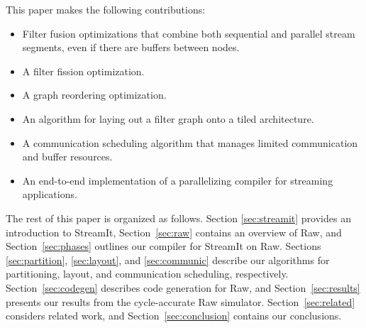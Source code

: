 This paper makes the following contributions:
\begin{itemize}
\item Filter fusion optimizations that combine both sequential and
parallel stream segments, even if there are buffers between nodes.
\item A filter fission optimization.
\item A graph reordering optimization.
\item An algorithm for laying out a filter graph onto a tiled architecture.
\item A communication scheduling algorithm that manages limited 
communication and buffer resources.
\item An end-to-end implementation of a parallelizing compiler for
streaming applications.
\end{itemize}

The rest of this paper is organized as follows.  Section
\ref{sec:streamit} provides an introduction to StreamIt,
Section~\ref{sec:raw} contains an overview of Raw, and
Section~\ref{sec:phases} outlines our compiler for StreamIt on Raw.
Sections \ref{sec:partition}, \ref{sec:layout}, and \ref{sec:communic}
describe our algorithms for partitioning, layout, and communication
scheduling, respectively.  Section~\ref{sec:codegen} describes code
generation for Raw, and Section~\ref{sec:results} presents our results
from the cycle-accurate Raw simulator.  Section~\ref{sec:related}
considers related work, and Section~\ref{sec:conclusion} contains our
conclusions.
